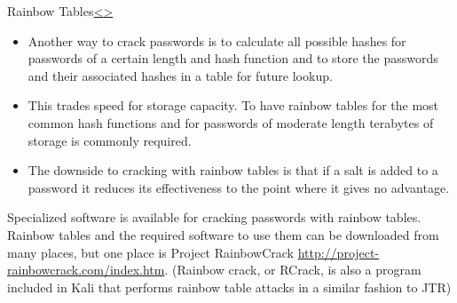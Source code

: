 \documentclass[12pt]{article}
\newenvironment{instructionblock}{\Large\bgroup}{\egroup}
\begin{document}
\vfill	

\pagebreak
\begin{slide}{Rainbow Tables}{\hyperref[slide 22]{\textless}\hyperref[slide 24]{\textgreater}}
\begin{instructionblock}
\begin{itemize}
\item Another way to crack passwords is to calculate all possible hashes for passwords of a certain length and hash function and to store the passwords and their associated hashes in a table for future lookup. 
\item This trades speed for storage capacity. To have rainbow tables for the most common hash functions and for passwords of moderate length terabytes of storage is commonly required.
\item The downside to cracking with rainbow tables is that if a salt is added to a password it reduces its effectiveness to the point where it gives no advantage.
\end{itemize}
\end{instructionblock}
\end{slide}
\cite{rainbowcrack}
\vfill
Specialized software is available for cracking passwords with rainbow tables. Rainbow tables and the required software to use them can be downloaded from many places, but one place is Project RainbowCrack \url{http://project-rainbowcrack.com/index.htm}.\cite{rainbowcrack} (Rainbow crack, or RCrack, is also a program included in Kali that performs rainbow table attacks in a similar fashion to JTR)
\end{document}
